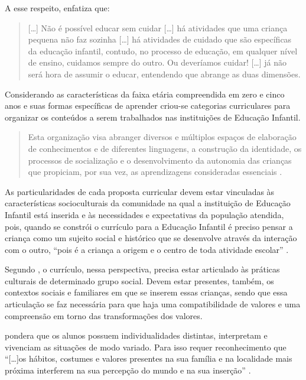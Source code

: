 \begin{refsection}
    A esse respeito, \textcite[p.~76]{KRAMER2003Formação} enfatiza que:  

    \begin{quotation}
        [\dots] Não é possível educar sem cuidar [\dots] há atividades que uma criança pequena não faz sozinha [\dots] há atividades de cuidado que são específicas da educação infantil, contudo, no processo de educação, em qualquer nível de ensino, cuidamos sempre do outro. Ou deveríamos cuidar! [\dots] já não será hora de assumir o educar, entendendo que abrange as duas dimensões. 
    \end{quotation}

    Considerando as características da faixa etária compreendida em zero e cinco anos e suas formas específicas de aprender criou-se categorias curriculares para organizar os conteúdos a serem trabalhados nas instituições de Educação Infantil.

    \begin{quotation}
        Esta organização visa abranger diversos e múltiplos espaços de elaboração de conhecimentos e de diferentes linguagens, a construção da identidade, os processos de socialização e o desenvolvimento da autonomia das crianças que propiciam, por sua vez, as aprendizagens consideradas essenciais \cite[p.~45]{RCNEI1998}.
    \end{quotation}

    As particularidades de cada proposta curricular devem estar vinculadas às características socioculturais da comunidade na qual a instituição de Educação Infantil está inserida e às necessidades e expectativas da população atendida, pois, quando se constrói o currículo para a Educação Infantil é preciso pensar a criança como um sujeito social e histórico que se desenvolve através da interação com o outro, “pois é a criança a origem e o centro de toda atividade escolar” \cite[p.~53]{MoreiraAndSilva2005Currículo}.  

    Segundo \textcite{BARBOSA2009Práticas}, o currículo, nessa perspectiva, precisa estar articulado às práticas culturais de determinado grupo social. Devem estar presentes, também, os contextos sociais e familiares em que se inserem essas crianças, sendo que essa articulação se faz necessária para que haja uma compatibilidade de valores e uma compreensão em torno das transformações dos valores. 

    \textcite{KISHIMOTO1994Currículo} pondera que os alunos possuem individualidades distintas, interpretam e vivenciam as situações de modo variado. Para isso requer reconhecimento que “[\dots]os hábitos, costumes e valores presentes na sua família e na localidade mais próxima interferem na sua percepção do mundo e na sua inserção” \cite[p.~22]{KRAMER2003Formação}. 


\end{refsection}

